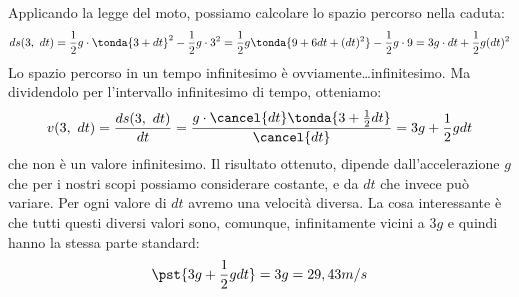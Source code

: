 Applicando la legge del moto, possiamo calcolare lo spazio percorso nella 
caduta: 
\[ds(3,~dt)=\frac{1}{2}g \cdot \tonda{3+dt}^2-\frac{1}{2}g \cdot 3^2= 
\frac{1}{2}g\tonda{9+6 dt+(dt)^2}-\frac{1}{2}g \cdot 9 = 
3 g\cdot dt+\frac{1}{2} g (dt)^2 %
\] 
Lo spazio percorso in un tempo infinitesimo è ovviamente\dots infinitesimo.
Ma dividendolo per l'intervallo infinitesimo di tempo, otteniamo:
\[v(3,~dt)=\frac{ds(3,~dt)}{dt}=
  \frac{g \cdot \cancel{dt} \tonda{3+ \frac{1}{2} dt}}{\cancel{dt}}=
  3g+\frac{1}{2}g dt\] 
che non è un valore infinitesimo. 
Il risultato ottenuto, dipende dall'accelerazione \(g\) che per i nostri 
scopi possiamo considerare costante, e da \(dt\) che invece può variare. Per 
ogni valore di \(dt\) avremo una velocità diversa.
La cosa interessante è che tutti questi diversi valori sono, comunque, 
infinitamente vicini a \(3g\) e quindi hanno la stessa parte standard:
\[\pst{3g+\frac{1}{2}g dt} = 3g = 29,43m/s\]

